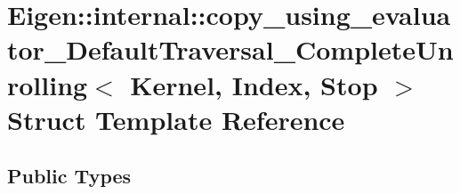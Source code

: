 \hypertarget{struct_eigen_1_1internal_1_1copy__using__evaluator___default_traversal___complete_unrolling}{}\section{Eigen\+:\+:internal\+:\+:copy\+\_\+using\+\_\+evaluator\+\_\+\+Default\+Traversal\+\_\+\+Complete\+Unrolling$<$ Kernel, Index, Stop $>$ Struct Template Reference}
\label{struct_eigen_1_1internal_1_1copy__using__evaluator___default_traversal___complete_unrolling}
\subsection*{Public Types}
